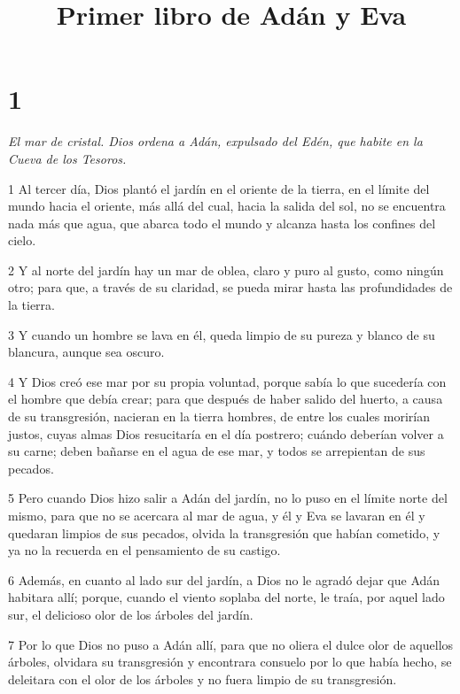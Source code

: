 

\title{Primer libro de Adán y Eva}

\chapter{1}

\par \textit{El mar de cristal. Dios ordena a Adán, expulsado del Edén, que habite en la Cueva de los Tesoros.}

\par 1 Al tercer día, Dios plantó el jardín en el oriente de la tierra, en el límite del mundo hacia el oriente, más allá del cual, hacia la salida del sol, no se encuentra nada más que agua, que abarca todo el mundo y alcanza hasta los confines del cielo.

\par 2 Y al norte del jardín hay un mar de oblea, claro y puro al gusto, como ningún otro; para que, a través de su claridad, se pueda mirar hasta las profundidades de la tierra.

\par 3 Y cuando un hombre se lava en él, queda limpio de su pureza y blanco de su blancura, aunque sea oscuro.

\par 4 Y Dios creó ese mar por su propia voluntad, porque sabía lo que sucedería con el hombre que debía crear; para que después de haber salido del huerto, a causa de su transgresión, nacieran en la tierra hombres, de entre los cuales morirían justos, cuyas almas Dios resucitaría en el día postrero; cuándo deberían volver a su carne; deben bañarse en el agua de ese mar, y todos se arrepientan de sus pecados.

\par 5 Pero cuando Dios hizo salir a Adán del jardín, no lo puso en el límite norte del mismo, para que no se acercara al mar de agua, y él y Eva se lavaran en él y quedaran limpios de sus pecados, olvida la transgresión que habían cometido, y ya no la recuerda en el pensamiento de su castigo.

\par 6 Además, en cuanto al lado sur del jardín, a Dios no le agradó dejar que Adán habitara allí; porque, cuando el viento soplaba del norte, le traía, por aquel lado sur, el delicioso olor de los árboles del jardín.

\par 7 Por lo que Dios no puso a Adán allí, para que no oliera el dulce olor de aquellos árboles, olvidara su transgresión y encontrara consuelo por lo que había hecho, se deleitara con el olor de los árboles y no fuera limpio de su transgresión.


